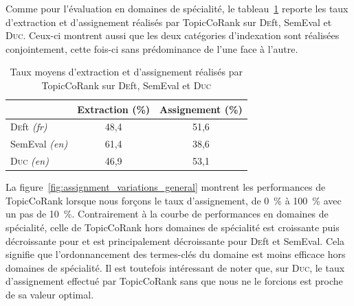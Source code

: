         Comme pour l'évaluation en domaines de spécialité, le
        tableau~\ref{tab:assignment_ratio_general} reporte les taux d'extraction
        et d'assignement réalisés par TopicCoRank sur \textsc{De}ft, SemEval et
        \textsc{Duc}. Ceux-ci montrent aussi que les deux catégories
        d'indexation sont réalisées conjointement, cette fois-ci sans
        prédominance de l'une face à l'autre.
        \begin{table}[h]
          \centering
          \begin{tabular}{l|c|c}
              \toprule
              & Extraction (\%) & Assignement (\%)\\
              \hline
              \textsc{De}ft \textit{(fr)} & 48,4 & 51,6\\
              SemEval \textit{(en)} & 61,4 & 38,6\\
              \textsc{Duc} \textit{(en)} & 46,9 & 53,1\\
              \bottomrule
          \end{tabular}
          \caption{Taux moyens d'extraction et d'assignement réalisés par
                   TopicCoRank sur \textsc{De}ft, SemEval et \textsc{Duc}
                   \label{tab:assignment_ratio_general}}
        \end{table}

        La figure~\ref{fig:assignment_variations_general} montrent les
        performances de TopicCoRank lorsque nous forçons le taux d'assignement,
        de 0~\% à 100~\% avec un pas de 10~\%. Contrairement à la courbe de
        performances en domaines de spécialité, celle de TopicCoRank hors
        domaines de spécialité est croissante puis décroissante pour 
        et est principalement décroissante pour \textsc{De}ft et SemEval. Cela signifie que
        l'ordonnancement des termes-clés du domaine est moins efficace hors
        domaines de spécialité. Il est toutefois intéressant de noter que, sur
        \textsc{Duc}, le taux d'assignement effectué par TopicCoRank sans que
        nous ne le forcions est proche de sa valeur optimal.
        

